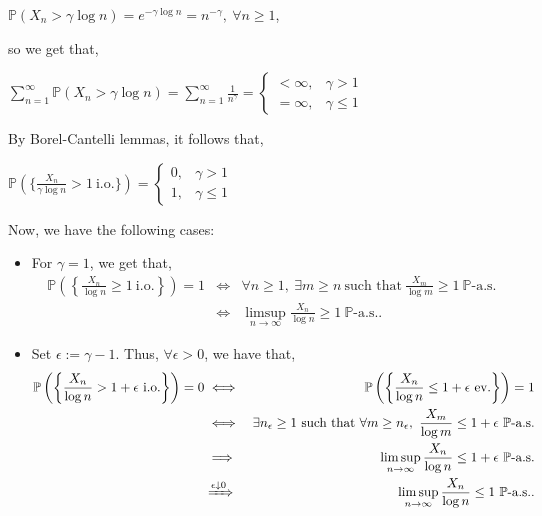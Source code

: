 \documentclass{article}
\begin{document}
\begin{center}
	$\mathbb{P}(X_n > \gamma\log{n}) = e^{-\gamma\log{n}} = n^{-\gamma}, \ \forall n \geq 1$,
\end{center}
so we get that,
\begin{center}
	$\sum_{n=1}^{\infty}\mathbb{P}(X_n > \gamma\log{n}) = \sum_{n=1}^{\infty}\frac{1}{n^{\gamma}} = 
	\begin{cases}
	< \infty, & \gamma>1 \\
	= \infty, & \gamma\leq1
	\end{cases}$
\end{center}
By Borel-Cantelli lemmas, it follows that,
\begin{center}
	$\mathbb{P}(\{\frac{X_n}{\gamma\log{n}} > 1 \ \text{i.o.}\}) = 
	\begin{cases}
	0, & \gamma>1 \\
	1, & \gamma\leq1
	\end{cases}$
\end{center}
Now, we have the following cases:
\begin{itemize}
	\item For $\gamma = 1$, we get that,
	\begin{eqnarray}
	\nonumber
	\mathbb{P}\left(\left\{\frac{X_n}{\log{n}} \geq 1 \ \text{i.o.}\right\}\right) = 1 &\iff& \forall n \geq 1, \ \exists m \geq n \ \text{such that} \ \frac{X_m}{\log{m}} \geq 1 \ \mathbb{P}\text{-a.s.}\\
	\nonumber
	&\iff& \limsup_{n\to\infty}\frac{X_n}{\log{n}} \geq 1 \ \mathbb{P}\text{-a.s.}.
	\end{eqnarray}
	\item Set $\epsilon := \gamma - 1$. Thus, $\forall \epsilon > 0$, we have that,
	\begin{eqnarray}
	\nonumber
	\mathbb{P}\left(\left\{\frac{X_n}{\log{n}} > 1+\epsilon \ \text{i.o.}\right\}\right) = 0 &\iff& \mathbb{P}\left(\left\{\frac{X_n}{\log{n}} \leq 1+\epsilon \ \text{ev.}\right\}\right) = 1\\
	\nonumber
	&\iff& \exists n_\epsilon \geq 1 \ \text{such that} \ \forall m \geq n_\epsilon, \ \frac{X_m}{\log{m}} \leq 1+\epsilon \ \mathbb{P}\text{-a.s.} \\
	\nonumber
	&\implies& \limsup_{n\to\infty}\frac{X_n}{\log{n}}\leq 1 + \epsilon \ \mathbb{P}\text{-a.s.} \\
	\nonumber
	&\xRightarrow{\epsilon \downarrow 0}& \limsup_{n\to\infty}\frac{X_n}{\log{n}}\leq 1 \ \mathbb{P}\text{-a.s.}.
	\end{eqnarray}
\end{itemize}
\end{document}

